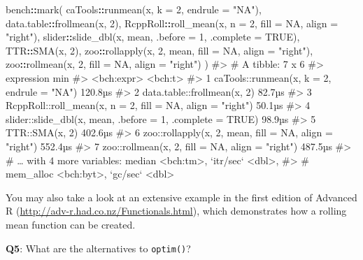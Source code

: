 \documentclass[
]{krantz}
\makeatletter
\newenvironment{Shaded}{\begin{snugshade}}{\end{snugshade}}
\newcommand{\CommentTok}[1]{\textcolor[rgb]{0.56,0.35,0.01}{\textit{#1}}}
\newcommand{\DataTypeTok}[1]{\textcolor[rgb]{0.13,0.29,0.53}{#1}}
\newcommand{\DecValTok}[1]{\textcolor[rgb]{0.00,0.00,0.81}{#1}}
\newcommand{\KeywordTok}[1]{\textcolor[rgb]{0.13,0.29,0.53}{\textbf{#1}}}
\newcommand{\NormalTok}[1]{#1}
\newcommand{\OperatorTok}[1]{\textcolor[rgb]{0.81,0.36,0.00}{\textbf{#1}}}
\newcommand{\OtherTok}[1]{\textcolor[rgb]{0.56,0.35,0.01}{#1}}
\newcommand{\StringTok}[1]{\textcolor[rgb]{0.31,0.60,0.02}{#1}}
\renewcommand{\href}[2]{#2 (\url{#1})}
\newenvironment{kframe}{%
\medskip{}
\setlength{\fboxsep}{.8em}
 \def\at@end@of@kframe{}%
 \ifinner\ifhmode%
  \def\at@end@of@kframe{\end{minipage}}%
  \begin{minipage}{\columnwidth}%
 \fi\fi%
 \def\FrameCommand##1{\hskip\@totalleftmargin \hskip-\fboxsep
 \colorbox{shadecolor}{##1}\hskip-\fboxsep
     \hskip-\linewidth \hskip-\@totalleftmargin \hskip\columnwidth}%
 \MakeFramed {\advance\hsize-\width
   \@totalleftmargin\z@ \linewidth\hsize
   \@setminipage}}%
 {\par\unskip\endMakeFramed%
 \at@end@of@kframe}
\renewenvironment{Shaded}{\begin{kframe}}{\end{kframe}}
\renewcommand{\KeywordTok} [1]{\textcolor[rgb]{0.00,0.44,0.13}{{#1}}}
\renewcommand{\DataTypeTok}[1]{\textcolor[rgb]{0.56,0.13,0.00}{{#1}}}
\renewcommand{\DecValTok}  [1]{\textcolor[rgb]{0.25,0.63,0.44}{{#1}}}
\renewcommand{\StringTok}  [1]{\textcolor[rgb]{0.25,0.44,0.63}{{#1}}}
\renewcommand{\CommentTok} [1]{\textcolor[rgb]{0.38,0.63,0.69}{{#1}}}
\renewcommand{\OtherTok}   [1]{\textcolor[rgb]{0.00,0.44,0.13}{{#1}}}
\renewcommand{\NormalTok}  [1]{{#1}}
\makeatother
\begin{document}
\begin{Shaded}
\begin{Highlighting}[]
\NormalTok{bench}\OperatorTok{::}\KeywordTok{mark}\NormalTok{(}
\NormalTok{  caTools}\OperatorTok{::}\KeywordTok{runmean}\NormalTok{(x, }\DataTypeTok{k =} \DecValTok{2}\NormalTok{, }\DataTypeTok{endrule =} \StringTok{"NA"}\NormalTok{),}
\NormalTok{  data.table}\OperatorTok{::}\KeywordTok{frollmean}\NormalTok{(x, }\DecValTok{2}\NormalTok{),}
\NormalTok{  RcppRoll}\OperatorTok{::}\KeywordTok{roll_mean}\NormalTok{(x, }\DataTypeTok{n =} \DecValTok{2}\NormalTok{, }\DataTypeTok{fill =} \OtherTok{NA}\NormalTok{, }\DataTypeTok{align =} \StringTok{"right"}\NormalTok{),}
\NormalTok{  slider}\OperatorTok{::}\KeywordTok{slide_dbl}\NormalTok{(x, mean, }\DataTypeTok{.before =} \DecValTok{1}\NormalTok{, }\DataTypeTok{.complete =} \OtherTok{TRUE}\NormalTok{),}
\NormalTok{  TTR}\OperatorTok{::}\KeywordTok{SMA}\NormalTok{(x, }\DecValTok{2}\NormalTok{),}
\NormalTok{  zoo}\OperatorTok{::}\KeywordTok{rollapply}\NormalTok{(x, }\DecValTok{2}\NormalTok{, mean, }\DataTypeTok{fill =} \OtherTok{NA}\NormalTok{, }\DataTypeTok{align =} \StringTok{"right"}\NormalTok{),}
\NormalTok{  zoo}\OperatorTok{::}\KeywordTok{rollmean}\NormalTok{(x, }\DecValTok{2}\NormalTok{, }\DataTypeTok{fill =} \OtherTok{NA}\NormalTok{, }\DataTypeTok{align =} \StringTok{"right"}\NormalTok{)}
\NormalTok{)}
\CommentTok{#> # A tibble: 7 x 6}
\CommentTok{#>   expression                                                    min}
\CommentTok{#>   <bch:expr>                                                <bch:t>}
\CommentTok{#> 1 caTools::runmean(x, k = 2, endrule = "NA")                120.8µs}
\CommentTok{#> 2 data.table::frollmean(x, 2)                                82.7µs}
\CommentTok{#> 3 RcppRoll::roll_mean(x, n = 2, fill = NA, align = "right")  50.1µs}
\CommentTok{#> 4 slider::slide_dbl(x, mean, .before = 1, .complete = TRUE)  98.9µs}
\CommentTok{#> 5 TTR::SMA(x, 2)                                            402.6µs}
\CommentTok{#> 6 zoo::rollapply(x, 2, mean, fill = NA, align = "right")    552.4µs}
\CommentTok{#> 7 zoo::rollmean(x, 2, fill = NA, align = "right")           487.5µs}
\CommentTok{#> # … with 4 more variables: median <bch:tm>, `itr/sec` <dbl>,}
\CommentTok{#> #   mem_alloc <bch:byt>, `gc/sec` <dbl>}
\end{Highlighting}
\end{Shaded}

You may also take a look at an extensive example in the \href{http://adv-r.had.co.nz/Functionals.html}{first edition of Advanced R}, which demonstrates how a rolling mean function can be created.

\textbf{{Q5}}: What are the alternatives to \texttt{optim()}?
\end{document}

